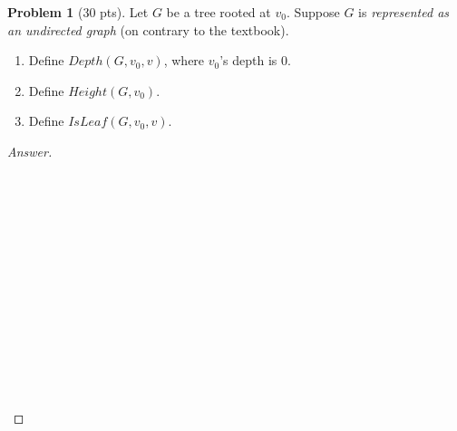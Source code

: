 \documentclass[11pt,a4paper,oneside,microtype,nokorean]{oblivoir}
\theoremstyle{definition}
\newtheorem{problem}{Problem}
\begin{document}
\begin{problem}[30 pts]
  Let $G$ be a tree rooted at $v_0$.  Suppose $G$ is \emph{represented as an undirected graph} (on
  contrary to the textbook).

  \begin{enumerate}
  \item Define $Depth(G, v_0, v)$, where $v_0$'s depth is 0.
  \item Define $Height(G, v_0)$.
  \item Define $IsLeaf(G, v_0, v)$.
  \end{enumerate}
\end{problem}
\begin{proof}[Answer]
  \ 
  \\
  \\
  \\
  \\
  \\
  \\
  \\
  \\
  \\
  \\
  \\
  \\
  \\
  \\
  \\
\end{proof}
\end{document}
